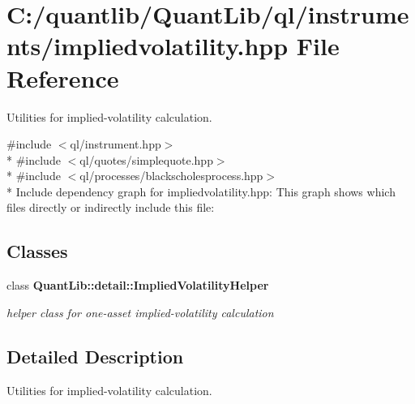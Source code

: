 \section{C\+:/quantlib/\+Quant\+Lib/ql/instruments/impliedvolatility.hpp File Reference}
\label{impliedvolatility_8hpp}


Utilities for implied-\/volatility calculation.  


{\ttfamily \#include $<$ql/instrument.\+hpp$>$}\\*
{\ttfamily \#include $<$ql/quotes/simplequote.\+hpp$>$}\\*
{\ttfamily \#include $<$ql/processes/blackscholesprocess.\+hpp$>$}\\*
Include dependency graph for impliedvolatility.\+hpp\+:
This graph shows which files directly or indirectly include this file\+:
\subsection*{Classes}
\begin{DoxyCompactItemize}
\item 
class {\bf Quant\+Lib\+::detail\+::\+Implied\+Volatility\+Helper}
\begin{DoxyCompactList}\small\item\em helper class for one-\/asset implied-\/volatility calculation \end{DoxyCompactList}\end{DoxyCompactItemize}


\subsection{Detailed Description}
Utilities for implied-\/volatility calculation. 

